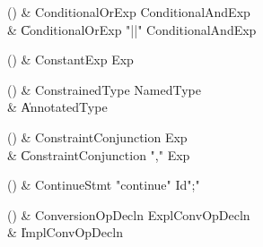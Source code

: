 \begin{bbgrammarappendix}{3.4in}

() & ConditionalOrExp \label{prod:ConditionalOrExp}  \: ConditionalAndExp  \\

 &    \| ConditionalOrExp \xcd"||" ConditionalAndExp \\

\end{bbgrammarappendix}

\begin{bbgrammarappendix}{3.9in}

() & ConstantExp \label{prod:ConstantExp}  \: Exp  \\


\end{bbgrammarappendix}

\begin{bbgrammarappendix}{3.5in}

() & ConstrainedType \label{prod:ConstrainedType}  \: NamedType  \\

 &    \| AnnotatedType \\

\end{bbgrammarappendix}

\begin{bbgrammarappendix}{2.9in}

() & ConstraintConjunction \label{prod:ConstraintConjunction}  \: Exp  \\

 &    \| ConstraintConjunction \xcd"," Exp \\

\end{bbgrammarappendix}

\begin{bbgrammarappendix}{3.8in}

() & ContinueStmt \label{prod:ContinueStmt}  \: \xcd"continue" Id\opt \xcd";"  \\


\end{bbgrammarappendix}

\begin{bbgrammarappendix}{3.3in}

() & ConversionOpDecln \label{prod:ConversionOpDecln}  \: ExplConvOpDecln  \\

 &    \| ImplConvOpDecln \\

\end{bbgrammarappendix}

